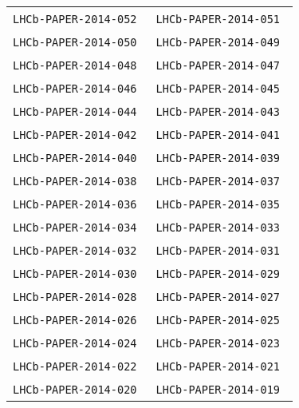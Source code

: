 \begin{center}
\begin{longtable}{ll}
\texttt{LHCb-PAPER-2014-052}~\cite{LHCb-PAPER-2014-052} &
\texttt{LHCb-PAPER-2014-051}~\cite{LHCb-PAPER-2014-051} \\
\texttt{LHCb-PAPER-2014-050}~\cite{LHCb-PAPER-2014-050} &
\texttt{LHCb-PAPER-2014-049}~\cite{LHCb-PAPER-2014-049} \\
\texttt{LHCb-PAPER-2014-048}~\cite{LHCb-PAPER-2014-048} &
\texttt{LHCb-PAPER-2014-047}~\cite{LHCb-PAPER-2014-047} \\
\texttt{LHCb-PAPER-2014-046}~\cite{LHCb-PAPER-2014-046} &
\texttt{LHCb-PAPER-2014-045}~\cite{LHCb-PAPER-2014-045} \\
\texttt{LHCb-PAPER-2014-044}~\cite{LHCb-PAPER-2014-044} &
\texttt{LHCb-PAPER-2014-043}~\cite{LHCb-PAPER-2014-043} \\
\texttt{LHCb-PAPER-2014-042}~\cite{LHCb-PAPER-2014-042} &
\texttt{LHCb-PAPER-2014-041}~\cite{LHCb-PAPER-2014-041} \\
\texttt{LHCb-PAPER-2014-040}~\cite{LHCb-PAPER-2014-040} &
\texttt{LHCb-PAPER-2014-039}~\cite{LHCb-PAPER-2014-039} \\
\texttt{LHCb-PAPER-2014-038}~\cite{LHCb-PAPER-2014-038} &
\texttt{LHCb-PAPER-2014-037}~\cite{LHCb-PAPER-2014-037} \\
\texttt{LHCb-PAPER-2014-036}~\cite{LHCb-PAPER-2014-036} &
\texttt{LHCb-PAPER-2014-035}~\cite{LHCb-PAPER-2014-035} \\
\texttt{LHCb-PAPER-2014-034}~\cite{LHCb-PAPER-2014-034} &
\texttt{LHCb-PAPER-2014-033}~\cite{LHCb-PAPER-2014-033} \\
\texttt{LHCb-PAPER-2014-032}~\cite{LHCb-PAPER-2014-032} &
\texttt{LHCb-PAPER-2014-031}~\cite{LHCb-PAPER-2014-031} \\
\texttt{LHCb-PAPER-2014-030}~\cite{LHCb-PAPER-2014-030} &
\texttt{LHCb-PAPER-2014-029}~\cite{LHCb-PAPER-2014-029} \\
\texttt{LHCb-PAPER-2014-028}~\cite{LHCb-PAPER-2014-028} &
\texttt{LHCb-PAPER-2014-027}~\cite{LHCb-PAPER-2014-027} \\
\texttt{LHCb-PAPER-2014-026}~\cite{LHCb-PAPER-2014-026} &
\texttt{LHCb-PAPER-2014-025}~\cite{LHCb-PAPER-2014-025} \\
\texttt{LHCb-PAPER-2014-024}~\cite{LHCb-PAPER-2014-024} &
\texttt{LHCb-PAPER-2014-023}~\cite{LHCb-PAPER-2014-023} \\
\texttt{LHCb-PAPER-2014-022}~\cite{LHCb-PAPER-2014-022} &
\texttt{LHCb-PAPER-2014-021}~\cite{LHCb-PAPER-2014-021} \\
\texttt{LHCb-PAPER-2014-020}~\cite{LHCb-PAPER-2014-020} &
\texttt{LHCb-PAPER-2014-019}~\cite{LHCb-PAPER-2014-019} \\

\end{longtable}
\end{center}
